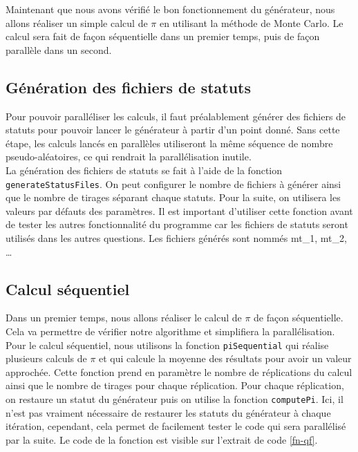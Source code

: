 \documentclass[a4paper]{article}
\begin{document}
Maintenant que nous avons vérifié le bon fonctionnement du générateur, nous
allons réaliser un simple calcul de $\pi$ en utilisant la méthode de Monte
Carlo. Le calcul sera fait de façon séquentielle dans un premier temps, puis de
façon parallèle dans un second.

\subsection{Génération des fichiers de statuts}

Pour pouvoir paralléliser les calculs, il faut préalablement générer des
fichiers de statuts pour pouvoir lancer le générateur à partir d'un point donné.
Sans cette étape, les calculs lancés en parallèles utiliseront la même séquence
de nombre pseudo-aléatoires, ce qui rendrait la parallélisation inutile.\\

La génération des fichiers de statuts se fait à l'aide de la fonction
\texttt{generateStatusFiles}. On peut configurer le nombre de fichiers à
générer ainsi que le nombre de tirages séparant chaque statuts. Pour la suite,
on utilisera les valeurs par défauts des paramètres. Il est important d'utiliser
cette fonction avant de tester les autres fonctionnalité du programme car les
fichiers de statuts seront utilisés dans les autres questions. Les fichiers
générés sont nommés mt\_1, mt\_2, \dots

\subsection{Calcul séquentiel}

Dans un premier temps, nous allons réaliser le calcul de $\pi$ de façon
séquentielle. Cela va permettre de vérifier notre algorithme et simplifiera la
parallélisation.\\

Pour le calcul séquentiel, nous utilisons la fonction \texttt{piSequential} qui
réalise plusieurs calculs de $\pi$ et qui calcule la moyenne des résultats pour
avoir un valeur approchée. Cette fonction prend en paramètre le nombre de
réplications du calcul ainsi que le nombre de tirages pour chaque réplication.
Pour chaque réplication, on restaure un statut du générateur puis on utilise la
fonction \texttt{computePi}. Ici, il n'est pas vraiment nécessaire de
restaurer les statuts du générateur à chaque itération, cependant, cela permet
de facilement tester le code qui sera parallélisé par la suite. Le code de la
fonction est visible sur l'extrait de code \ref{fn-qf}.
\clearpage
\end{document}
